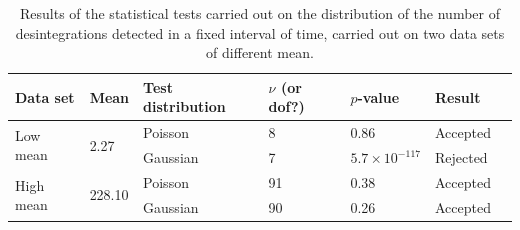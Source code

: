\begin{table}[htbp]
    \centering
    \begin{tabular}{lllllll}
        \hline
        Data set & Mean & Test distribution & $\nu$ (or dof?) & $p$-value & Result \\
        \hline
        \multirow{2}{*}{Low mean} & \multirow{2}{*}{2.27} & Poisson & 8 & 0.86 & Accepted\\
        & & Gaussian & 7 & $5.7 \times 10^{-117}$ & Rejected \\
        \multirow{2}{*}{High mean} & \multirow{2}{*}{228.10} & Poisson & 91 & 0.38 & Accepted\\
        & & Gaussian & 90 & 0.26 & Accepted\\
        \hline
    \end{tabular}
    \caption{Results of the statistical tests carried out on 
    the distribution of the number of desintegrations detected 
    in a fixed interval of time, carried out on two data sets 
    of different mean.}
    \label{tab:statistical_tests}
\end{table}

